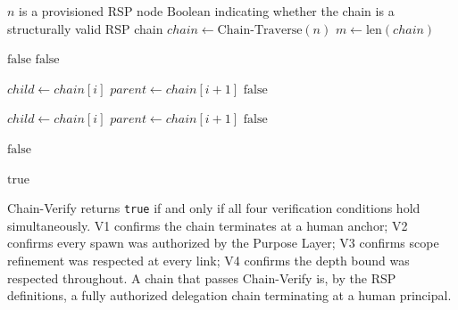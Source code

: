 \begin{algorithm}
\caption{Chain-Verify($n$) --- Verify the authorization chain from node $n$ to human anchor}
\label{alg:chain-verify}
\begin{algorithmic}[1]
\REQUIRE $n$ is a provisioned RSP node
\ENSURE $\mathrm{Boolean}$ indicating whether the chain is a structurally valid RSP chain
\STATE $chain \leftarrow \mathrm{Chain\text{-}Traverse}(n)$
\STATE $m \leftarrow \mathrm{len}(chain)$

\STATE {}
    \STATE \RETURN $\text{false}$ 
\ENDIF
{}
    \STATE \RETURN $\text{false}$ 
\ENDIF

\STATE {}
    \STATE $child \leftarrow chain[i]$
    \STATE $parent \leftarrow chain[i+1]$
        \STATE \RETURN $\text{false}$ 
    \ENDIF
\ENDFOR

\STATE {}
    \STATE $child \leftarrow chain[i]$
    \STATE $parent \leftarrow chain[i+1]$
        \STATE \RETURN $\text{false}$ 
    \ENDIF
\ENDFOR

\STATE {}
        \STATE \RETURN $\text{false}$ 
    \ENDIF
\ENDFOR

\RETURN $\text{true}$
\end{algorithmic}
\end{algorithm}

Chain-Verify returns \texttt{true} if and only if all four verification conditions hold simultaneously. V1 confirms the chain terminates at a human anchor; V2 confirms every spawn was authorized by the Purpose Layer; V3 confirms scope refinement was respected at every link; V4 confirms the depth bound was respected throughout. A chain that passes Chain-Verify is, by the RSP definitions, a fully authorized delegation chain terminating at a human principal.

